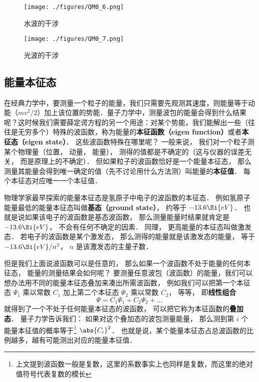 \begin{figure}[ht]
\centering
\texttt{[image: ./figures/QM0\_6.png]}
\caption{水波的干涉} \label{QM0_fig6}
\end{figure}

\begin{figure}[ht]
\centering
\texttt{[image: ./figures/QM0\_7.png]}
\caption{光波的干涉} \label{QM0_fig7}
\end{figure}


\subsection{能量本征态}
在经典力学中，要测量一个粒子的能量，我们只需要先观测其速度，则能量等于动能（$mv^2/2$）加上该位置的势能．量子力学中，测量波包的能量会得到什么结果呢？这时候我们需要薛定谔方程的另一个用途：对某个势能，我们能解出一些（往往是无穷多个）特殊的波函数，称为能量的\textbf{本征函数（eigen function）}或者\textbf{本征态（eigen state）}． 这些波函数特殊在哪里呢？ 一般来说， 我们对一个粒子测某个物理量（位置， 动量， 能量）， 测得的值都是不确定的（这与仪器的误差无关， 而是原理上的不确定）． 但如果粒子的波函数恰好是一个能量本征态， 那么测量其能量会得到唯一确定的值（先不讨论用什么方法测）叫能量的\textbf{本征值}． 每个本征态对应唯一一个本征值．

物理学家最早探索的能量本征态是氢原子中电子的波函数的本征态． 例如氢原子能量最低的能量本征态叫做\textbf{基态（ground state）}， 约等于 $-13.6\Si{eV}$． 也就是说如果该电子的波函数是基态波函数， 那么测量能量时结果就肯定是 $-13.6\Si{eV}$， 不会有任何不确定的因素． 同理， 更高能量的本征态叫做激发态． 若电子的波函数是某个激发态， 那么测得的能量就是该激发态的能量， 等于 $-13.6\Si{eV}/n^2$， $n$ 是该激发态的主量子数．

但是我们上面说波函数可以是任意的， 那么如果一个波函数不处于能量的任何本征态， 能量的测量结果会如何呢？ 要测量任意波包（波函数）的能量，我们可以想办法用不同的能量本征态叠加来凑出所需波函数， 例如我们可以把第一个本征态 $\Psi_1$ 乘以常数 $C_1$ 加上第二个本征态 $\Psi_2$ 乘以常数 $C_2$， 等等， 即\textbf{线性组合}
\begin{equation}
\Psi = C_1\Psi_1 + C_2\Psi_2 + \dots
\end{equation}
就得到了一个不处于任何能量本征态的波函数， 可以把它称为本征函数的\textbf{叠加态}． 量子力学告诉我们： 如果对这个叠加态的波包测量能量， 那么测到第 $i$ 个能量本征值的概率等于\footnote{上文提到波函数一般是复数，这里的系数事实上也同样是复数，而这里的绝对值符号代表复数的模长} $\abs{C_i}^2$． 也就是说，某个能量本征态占总波函数的比例越多，越有可能测出对应的能量本征值．

